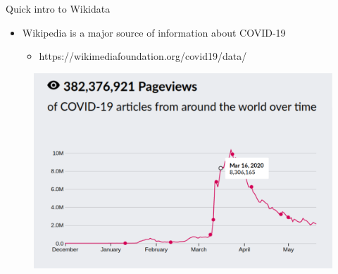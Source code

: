 \documentclass{beamer}
\begin{document}
\begin{frame}{Quick intro to Wikidata}

\begin{itemize}
    \item Wikipedia is a major source of information about COVID-19
    
    \begin{itemize}
        \item https://wikimediafoundation.org/covid19/data/
    \end{itemize}
    
\end{itemize}

\begin{figure}
\includegraphics[scale=0.45]{fig/wikipedia_access_covid_19.png}
\end{figure}
\end{frame}
\end{document}
